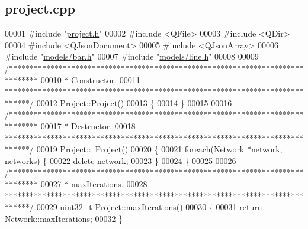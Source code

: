\hypertarget{project_8cpp_source}{}\subsection{project.\+cpp}
\label{project_8cpp_source}

\begin{DoxyCode}
00001 \textcolor{preprocessor}{#include "\hyperlink{project_8h}{project.h}"}
00002 \textcolor{preprocessor}{#include <QFile>}
00003 \textcolor{preprocessor}{#include <QDir>}
00004 \textcolor{preprocessor}{#include <QJsonDocument>}
00005 \textcolor{preprocessor}{#include <QJsonArray>}
00006 \textcolor{preprocessor}{#include "\hyperlink{bar_8h}{models/bar.h}"}
00007 \textcolor{preprocessor}{#include "\hyperlink{line_8h}{models/line.h}"}
00008 
00009 \textcolor{comment}{/*******************************************************************************}
00010 \textcolor{comment}{ * Constructor.}
00011 \textcolor{comment}{ ******************************************************************************/}
\hypertarget{project_8cpp_source_l00012}{}\hyperlink{class_project_aa007ecd17d5bc800e7a956cf666eea21}{00012} \hyperlink{class_project_aa007ecd17d5bc800e7a956cf666eea21}{Project::Project}()
00013 \{
00014 \}
00015 
00016 \textcolor{comment}{/*******************************************************************************}
00017 \textcolor{comment}{ * Destructor.}
00018 \textcolor{comment}{ ******************************************************************************/}
\hypertarget{project_8cpp_source_l00019}{}\hyperlink{class_project_ad165d61b76ee86ee9c27fd987a2a7b9e}{00019} \hyperlink{class_project_ad165d61b76ee86ee9c27fd987a2a7b9e}{Project::~Project}()
00020 \{
00021   \textcolor{keywordflow}{foreach}(\hyperlink{class_network}{Network} *network, \hyperlink{class_project_aa98126154cab59769a431668e6f17daf}{networks}) \{
00022     \textcolor{keyword}{delete} network;
00023   \}
00024 \}
00025 
00026 \textcolor{comment}{/*******************************************************************************}
00027 \textcolor{comment}{ * maxIterations.}
00028 \textcolor{comment}{ ******************************************************************************/}
\hypertarget{project_8cpp_source_l00029}{}\hyperlink{class_project_ab9d6426396a75f2fcaeadcddcd0fac64}{00029} uint32\_t \hyperlink{class_project_ab9d6426396a75f2fcaeadcddcd0fac64}{Project::maxIterations}()
00030 \{
00031   \textcolor{keywordflow}{return} \hyperlink{group___models_ga318dee060bc577eacd67d332efbbe1b2}{Network::maxIterations};
00032 \}

\end{DoxyCode}
